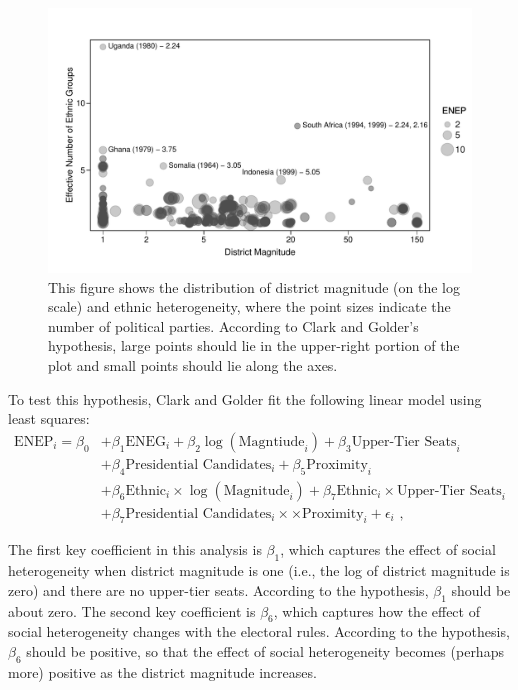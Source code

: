 \documentclass[12pt]{article}
\begin{document}
\begin{figure}[h!]
\begin{center}
\includegraphics[scale = 0.8]{figs/cg-scatter.pdf}
\caption{This figure shows the distribution of district magnitude (on the log scale) and ethnic heterogeneity, where the point sizes indicate the number of political parties. 
According to Clark and Golder's hypothesis, large points should lie in the upper-right portion of the plot and small points should lie along the axes.}\label{fig:cg-scatter}
\end{center}
\end{figure}

To test this hypothesis, Clark and Golder fit the following linear model using least squares:
\begin{align*}
\text{ENEP}_i = \beta_0 &+ \beta_1 \text{ENEG}_i + \beta_2 \log(\text{Magntiude}_i) + \beta_3 \text{Upper-Tier Seats}_i\\
                                                     &+\beta_4 \text{Presidential Candidates}_i + \beta_5 \text{Proximity}_i\\
                                                     &+ \beta_6 \text{Ethnic}_i \times \log (\text{Magnitude}_i) + \beta_7 \text{Ethnic}_i \times \text{Upper-Tier Seats}_i\\
                                                     &+ \beta_7 \text{Presidential Candidates}_i \times \times \text{Proximity}_i + \epsilon_i\text{ ,}
\end{align*}

The first key coefficient in this analysis is $\beta_1$, which captures the effect of social heterogeneity when district magnitude is one (i.e., the log of district magnitude is zero) and there are no upper-tier seats. 
According to the hypothesis, $\beta_1$ should be about zero. 
The second key coefficient is $\beta_6$, which captures how the effect of social heterogeneity changes with the electoral rules. 
According to the hypothesis, $\beta_6$ should be positive, so that the effect of social heterogeneity becomes (perhaps more) positive as the district magnitude increases.
\end{document}
